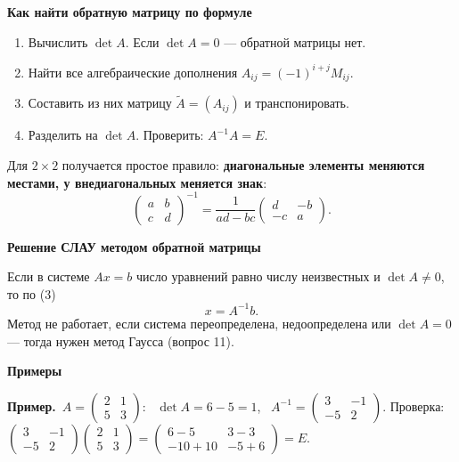 \documentclass[a4paper,11pt]{article}
\newcommand{\prim}{\par\smallskip\noindent\textbf{\textcolor{teoc!80!black}{Пример.}}\ }
\newcommand{\podr}[1]{\par\needspace{8\baselineskip}\medskip
  {\large\bfseries\textcolor{oprc!80!black}{#1}}\par\nopagebreak\smallskip}
\begin{document}
\podr{Как найти обратную матрицу по формуле}

\begin{enumerate}[leftmargin=*]
  \item Вычислить $\det A$. Если $\det A = 0$ --- обратной матрицы нет.
  \item Найти все алгебраические дополнения $A_{ij} = (-1)^{i+j} M_{ij}$.
  \item Составить из них матрицу $\tilde A = (A_{ij})$ и транспонировать.
  \item Разделить на $\det A$. Проверить: $A^{-1} A = E$.
\end{enumerate}

Для $2 \times 2$ получается простое правило: \textbf{диагональные элементы меняются местами, у внедиагональных меняется знак}:
\[
  \begin{pmatrix} a & b \\ c & d \end{pmatrix}^{-1} = \frac{1}{ad - bc} \begin{pmatrix} d & -b \\ -c & a \end{pmatrix}.
\]

\podr{Решение СЛАУ методом обратной матрицы}

Если в системе $Ax = b$ число уравнений равно числу неизвестных и $\det A \ne 0$, то по (3)
\[
  x = A^{-1} b.
\]
Метод не работает, если система переопределена, недоопределена или $\det A = 0$ --- тогда нужен метод Гаусса (вопрос 11).

\podr{Примеры}

\prim $A = \begin{pmatrix} 2 & 1 \\ 5 & 3 \end{pmatrix}$: \ $\det A = 6 - 5 = 1$, \
$A^{-1} = \begin{pmatrix} 3 & -1 \\ -5 & 2 \end{pmatrix}$.
Проверка: $\begin{pmatrix} 3 & -1 \\ -5 & 2 \end{pmatrix}\begin{pmatrix} 2 & 1 \\ 5 & 3 \end{pmatrix} = \begin{pmatrix} 6 - 5 & 3 - 3 \\ -10 + 10 & -5 + 6 \end{pmatrix} = E$. \checkmark
\end{document}
